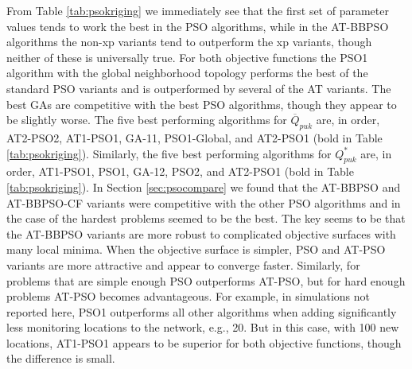 \documentclass[cmbright]{staauth}
\begin{document}
From Table \ref{tab:psokriging} we immediately see that the first set of parameter values tends to work the best in the PSO algorithms, while in the AT-BBPSO algorithms the non-xp variants tend to outperform the xp variants, though neither of these is universally true. For both objective functions the PSO1 algorithm with the global neighborhood topology performs the best of the standard PSO variants and is outperformed by several of the AT variants. The best GAs are competitive with the best PSO algorithms, though they appear to be slightly worse. The five best performing algorithms for $\overline{Q}_{puk}$ are, in order, AT2-PSO2, AT1-PSO1, GA-11, PSO1-Global, and AT2-PSO1 (bold in Table \ref{tab:psokriging}). Similarly, the five best performing algorithms for $Q^*_{puk}$ are, in order, AT1-PSO1, PSO1, GA-12, PSO2, and AT2-PSO1 (bold in Table \ref{tab:psokriging}). In Section \ref{sec:psocompare} we found that the AT-BBPSO and AT-BBPSO-CF variants were competitive with the other PSO algorithms and in the case of the hardest problems seemed to be the best. The key seems to be that the AT-BBPSO variants are more robust to complicated objective surfaces with many local minima. When the objective surface is simpler, PSO and AT-PSO variants are more attractive and appear to converge faster. Similarly, for problems that are simple enough PSO outperforms AT-PSO, but for hard enough problems AT-PSO becomes advantageous. For example, in simulations not reported here, PSO1 outperforms all other algorithms when adding significantly less monitoring locations to the network, e.g., 20. But in this case, with 100 new locations, AT1-PSO1 appears to be superior for both objective functions, though the difference is small.
\end{document}
